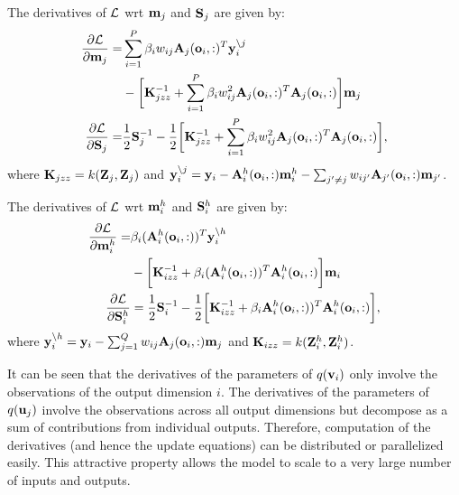 \newcommand{\Lgj}{\calL^g_j}
\newcommand{\ynoj}{\y_i^{\backslash j}}
\newcommand{\Kjzz}{\mat{K}_{jzz}}
\noindent The derivatives of $\calL$ wrt $\m_j$ and $\S_j$ are given by:
\begin{align}
\nonumber
\deriv{\calL}{\m_j} 
=& \sum_{i=1}^P \beta_i w_{ij} \A_j(\oi,:)^T \ynoj \\
&- \bigg[\Kjzz^{-1} + \sum_{i=1}^P \beta_i w_{ij}^2 \A_j(\oi,:)^T \A_j(\oi,:) \bigg] \m_j \\
\deriv{\calL}{\S_j} 
=& \frac{1}{2} \S_j^{-1} - \frac{1}{2} \bigg[ \Kjzz^{-1} + \sum_{i=1}^P \beta_i w_{ij}^2 \A_j(\oi,:)^T \A_j(\oi,:) \bigg],
\end{align}
where $\Kjzz = k(\Zj,\Zj)$ and $\y_i^{\backslash j} = \y_i - \Ahi(\oi,:) \mhi - \sum_{j' \neq j} w_{ij'} \A_{j'}(\oi,:) \m_{j'}$.

\newcommand{\Lhi}{\calL^h_i}
\newcommand{\Kizz}{\mat{K}_{izz}}
\noindent The derivatives of $\calL$ wrt $\mhi$ and $\Shi$ are given by:
\newcommand{\ynoh}{\y_i^{\backslash h}}
\begin{align}
\nonumber
\deriv{\calL}{\mhi}
= & \beta_i (\Ahi(\oi,:))^T \ynoh \\ 
& - \bigg[\Kizz^{-1} +  \beta_i (\Ahi(\oi,:))^T \Ahi(\oi,:) \bigg] \m_i \\
\deriv{\calL}{\Shi} 
&= \frac{1}{2} \S_i^{-1} - \frac{1}{2} \bigg[ \Kizz^{-1} + \beta_i \Ahi(\oi,:))^T \Ahi(\oi,:) \bigg] ,
\end{align}
where $\ynoh = \y_i - \sum_{j=1}^Q w_{ij} \A_j(\oi,:) \m_j$ and $\Kizz = k(\Zhi, \Zhi)$.

\noindent It can be seen that the derivatives of the parameters of $q(\v_i)$ only involve the observations of the output dimension $i$.
The derivatives of the parameters of $q(\u_j)$ involve the observations across all output dimensions but decompose as a sum of contributions from individual outputs.
Therefore, computation of the derivatives (and hence the update equations) can be distributed or parallelized easily.
This attractive property allows the model to scale to a very large number of inputs and outputs.

